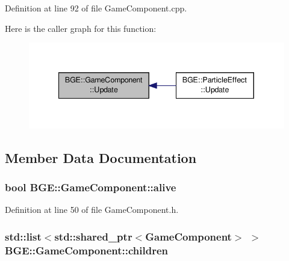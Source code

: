 Definition at line 92 of file Game\-Component.\-cpp.



Here is the caller graph for this function\-:
\nopagebreak
\begin{figure}[H]
\begin{center}
\leavevmode
\includegraphics[width=340pt]{class_b_g_e_1_1_game_component_ac8e444827ee0be9ad654cdff4d15f071_icgraph}
\end{center}
\end{figure}




\subsection{Member Data Documentation}
\hypertarget{class_b_g_e_1_1_game_component_a4970da7fc085e98e6eb30d311798a107}{
\subsubsection[{alive}]{\setlength{\rightskip}{0pt plus 5cm}bool B\-G\-E\-::\-Game\-Component\-::alive}}\label{class_b_g_e_1_1_game_component_a4970da7fc085e98e6eb30d311798a107}


Definition at line 50 of file Game\-Component.\-h.

\hypertarget{class_b_g_e_1_1_game_component_a58420cfb1df531c60191cce09f0e6b4c}{
\subsubsection[{children}]{\setlength{\rightskip}{0pt plus 5cm}std\-::list$<$std\-::shared\-\_\-ptr$<${\bf Game\-Component}$>$ $>$ B\-G\-E\-::\-Game\-Component\-::children}}\label{class_b_g_e_1_1_game_component_a58420cfb1df531c60191cce09f0e6b4c}



